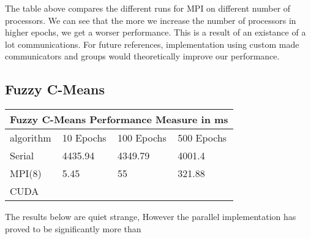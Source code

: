 \begin{multicols*}{2}
    The table above compares the different runs for MPI on different number of processors. We can see that the more we increase the number of processors in higher epochs, we get a worser performance. This is a result of an existance of a lot communications. For future references, implementation using custom made communicators and groups would theoretically improve our performance.

    \subsection{Fuzzy C-Means}
    \begin{tabular}{ |p{2cm}||p{1.2cm}|p{1.2cm}|p{1.2cm}|  }
        \hline
        \multicolumn{4}{|c|}{Fuzzy C-Means Performance Measure in ms} \\
        \hline
        algorithm& 10 Epochs &100 Epochs&500 Epochs\\
        \hline
        Serial  &  4435.94    &    4349.79   &  4001.4 \\
        MPI(8)     &   5.45    &    55   &  321.88 \\
        CUDA    &       &       &   \\
        \hline
    \end{tabular}

    The results below are quiet strange, However the parallel implementation has proved to be significantly more than
\end{multicols*}


